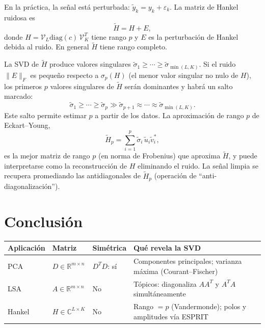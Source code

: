 \documentclass[12pt]{article}
\newcommand{\R}{\mathbb{R}}
\newcommand{\C}{\mathbb{C}}
\begin{document}
En la práctica, la señal está perturbada: $\tilde{y}_k = y_k + \varepsilon_k$. La matriz de Hankel ruidosa es
\[
  \tilde{H} = H + E,
\]
donde $H = \mathcal{V}_L \mathrm{diag}(c)\, \mathcal{V}_K^T$ tiene rango $p$ y $E$ es la perturbación de Hankel debida al ruido. En general $\tilde{H}$ tiene rango completo.

La SVD de $\tilde{H}$ produce valores singulares $\tilde{\sigma}_1 \geq \cdots \geq \tilde{\sigma}_{\min(L,K)}$. Si el ruido $\|E\|_F$ es pequeño respecto a $\sigma_p(H)$ (el menor valor singular no nulo de $H$), los primeros $p$ valores singulares de $\tilde{H}$ serán dominantes y habrá un salto marcado:
\[
  \tilde{\sigma}_1 \geq \cdots \geq \tilde{\sigma}_p \gg \tilde{\sigma}_{p+1} \approx \cdots \approx \tilde{\sigma}_{\min(L,K)}.
\]
Este salto permite estimar $p$ a partir de los datos. La aproximación de rango $p$ de Eckart--Young,
\[
  \tilde{H}_p = \sum_{i=1}^p \tilde{\sigma}_i\, \tilde{u}_i \tilde{v}_i^*,
\]
es la mejor matriz de rango $p$ (en norma de Frobenius) que aproxima $\tilde{H}$, y puede interpretarse como la reconstrucción de $H$ eliminando el ruido. La señal limpia se recupera promediando las antidiagonales de $\tilde{H}_p$ (operación de ``anti-diagonalización'').


\section*{Conclusión}

\begin{center}
\renewcommand{\arraystretch}{1.4}
\begin{tabular}{lllp{6.5cm}}
\hline
\textbf{Aplicación} & \textbf{Matriz} & \textbf{Simétrica} & \textbf{Qué revela la SVD} \\
\hline
PCA & $D \in \R^{m\times n}$ & $D^TD$: sí & Componentes principales; varianza máxima (Courant--Fischer) \\
LSA & $A \in \R^{m\times n}$ & No & Tópicos: diagonaliza $AA^T$ y $A^TA$ simultáneamente \\
Hankel & $H \in \C^{L\times K}$ & No & Rango $= p$ (Vandermonde); polos y amplitudes vía ESPRIT \\
\hline
\end{tabular}
\renewcommand{\arraystretch}{1}
\end{center}

\medskip
\end{document}
